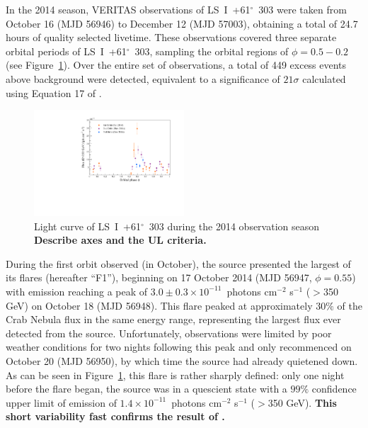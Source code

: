 \documentclass[preprint2]{aastex}
\newcommand{\pflux}{~photons cm$^{-2}$ s$^{-1}$}
\newcommand{\lsi}{LS~I~+61$^{\circ}$~303}
\begin{document}
In the 2014 season, VERITAS observations of \lsi{} were taken from October 16 (MJD 56946) to  December 12 (MJD 57003), obtaining a total of 24.7 hours of quality selected livetime. These observations covered three separate orbital periods of \lsi{}, sampling the orbital regions of $\phi = 0.5-0.2$ (see Figure~\ref{f:fig1}). Over the entire set of observations, a total of 449 excess events above background were detected, equivalent to a significance of $21\sigma$ calculated using Equation 17 of \citet{LiMa}.

\begin{figure}[ht]
\centering
\includegraphics[width=0.5\textwidth]{./figs/fluxvphase.pdf}
\caption{Light curve of \lsi{} during the 2014 observation season %
\textbf{Describe axes and the UL criteria.}}
\label{f:fig1}
\end{figure}

During the first orbit observed (in October), the source presented the largest of its flares (hereafter ``F1''), beginning on 17 October 2014 (MJD 56947, $\phi = 0.55$) with emission reaching a peak of $3.0 \pm 0.3 \times10^{-11}$\pflux{} ($>$350 GeV) on October 18 (MJD 56948). This flare peaked at approximately $30\%$ of the Crab Nebula flux in the same energy range, representing the largest flux ever detected from the source. Unfortunately, observations were limited by poor weather conditions for two nights following this peak and only recommenced on October 20 (MJD 56950), by which time the source had already quietened down. As can be seen in Figure~\ref{f:fig1}, this flare is rather sharply defined: only one night before the flare began, the source was in a quescient state with a $99\%$ confidence upper limit of emission of $1.4 \times10^{-11}$\pflux{} ($>$350 GeV). \textbf{This short variability fast confirms the result of \citep{2013ApJ...779...88A}.}
\end{document}
